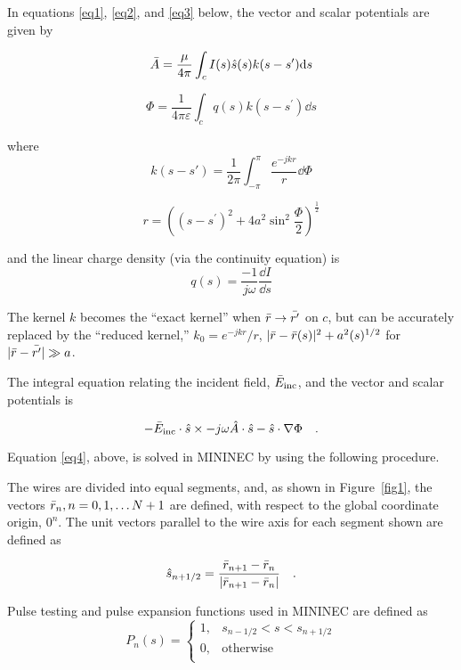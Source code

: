 \documentclass[12pt]{article}
\begin{document}
In equations \eqref{eq1}, \eqref{eq2}, and \eqref{eq3} below, the vector and
scalar potentials are given by

\begin{equation}
\bar{A} = \frac{\mu}{4\pi} \int_c I(s)\hat{s}(s)k(s-s^\prime)\mathrm{d}s
\label{eq1}
\end{equation}

\begin{equation}
\Phi = \frac{1}{4\pi\varepsilon} \int_c q(s)k(s-s^\prime)\dd{s}
\label{eq2}
\end{equation}

where
\[ k(s-s\prime) = \frac{1}{2\pi}\int_{-\pi}^{\pi} \frac{e^{-jkr}}{r}\dd{\Phi}
\]

\[ r = ((s-s^\prime)^2 + 4a^2\sin^2\frac{\Phi}{2})^{\frac{1}{2}}
\]

and the linear charge density (via the continuity equation) is
\begin{equation}
q(s) = \frac{-1}{j\omega}\frac{\dd{I}}{\dd{s}}
\label{eq3}
\end{equation}

The kernel $k$ becomes the ``exact kernel'' when
$\bar{r}\rightarrow\bar{r^\prime}$ on $c$, but can be accurately
replaced by the ``reduced kernel,''
$k_0 = e^{-jkr}/r$, $|\bar{r} - \bar{r}(s)|^2+a^2(s)^{1/2}$
for $|\bar{r}-\bar{r^\prime}| \gg a$.

The integral equation relating the incident field, $\bar{E}_{\mathrm{inc}}$, and the
vector and scalar potentials is

\begin{equation}
-\bar{E}_{\mathrm{inc}}\cdot\hat{s}\times
-j\omega\hat{A}\cdot\hat{s}-\hat{s}\cdot\nabla\Phi
\quad .
\label{eq4}
\end{equation}

Equation \eqref{eq4}, above, is solved in MININEC by using the following
procedure.

The wires are divided into equal segments, and, as shown in
Figure~\ref{fig1}, the vectors $\bar{r}_n, n=0, 1, \ldots N+1$ are
defined, with respect to the global coordinate origin, $0^n$. The unit
vectors parallel to the wire axis for each segment shown are defined as

\begin{equation}
\hat{s}_{n+1/2} = \frac{\bar{r}_{n+1}
- \bar{r}_n}{|\bar{r}_{n+1}-\bar{r}_n|}
\quad .
\label{eq5}
\end{equation}

Pulse testing and pulse expansion functions used in MININEC are defined as
\begin{equation}
P_n(s) = \left\{
\begin{array}{ll}
1, & s_{n-1/2} < s < s_{n+1/2} \\
0, & \mathrm{otherwise}        \\
\end{array}\right.
\label{eq6}
\end{equation}
\end{document}
